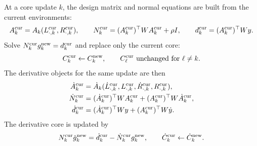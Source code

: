 \documentclass[11pt]{article}
\numberwithin{equation}{section}
\begin{document}
At a core update \(k\), the design matrix and normal equations are built from
the current environments:
\begin{equation}
    A_k^{\rm cur}
    =
    A_k(L_{\cdot,k}^{\rm cur},R_{\cdot,k}^{\rm cur}),
    \qquad
    N_k^{\rm cur}
    =
    (A_k^{\rm cur})^\top W A_k^{\rm cur}+\rho I,
    \qquad
    d_k^{\rm cur}=(A_k^{\rm cur})^\top W y.
    \label{eq:p26-sweep-recompute-6}
\end{equation}
Solve \(N_k^{\rm cur}g_k^{\rm new}=d_k^{\rm cur}\) and replace only the
current core:
\begin{equation}
    C_k^{\rm cur}\leftarrow C_k^{\rm new},
    \qquad
    C_\ell^{\rm cur}\ \text{unchanged for }\ell\ne k.
    \label{eq:p26-sweep-recompute-7}
\end{equation}
The derivative objects for the same update are then
\begin{equation}
\begin{aligned}
    \dot A_k^{\rm cur}
    &=
    \dot A_k(\dot L_{\cdot,k}^{\rm cur},L_{\cdot,k}^{\rm cur},
             \dot R_{\cdot,k}^{\rm cur},R_{\cdot,k}^{\rm cur}),\\
    \dot N_k^{\rm cur}
    &=
    (\dot A_k^{\rm cur})^\top W A_k^{\rm cur}
    +
    (A_k^{\rm cur})^\top W\dot A_k^{\rm cur},\\
    \dot d_k^{\rm cur}
    &=
    (\dot A_k^{\rm cur})^\top W y
    +
    (A_k^{\rm cur})^\top W\dot y.
\end{aligned}
    \label{eq:p26-sweep-recompute-8}
\end{equation}
The derivative core is updated by
\begin{equation}
    N_k^{\rm cur}\dot g_k^{\rm new}
    =
    \dot d_k^{\rm cur}-\dot N_k^{\rm cur}g_k^{\rm new},
    \qquad
    \dot C_k^{\rm cur}\leftarrow \dot C_k^{\rm new}.
    \label{eq:p26-sweep-recompute-9}
\end{equation}
\end{document}
